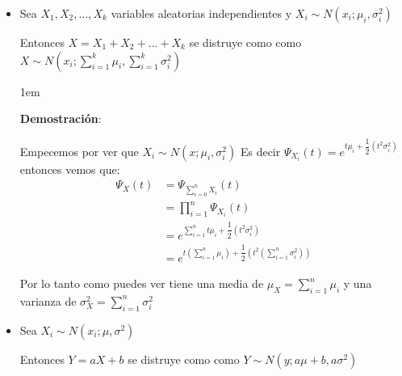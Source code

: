 \documentclass[12pt, fleqn]{report}                             %
\newenvironment{SmallIndentation}[1][0.75em]                    %
        {\begin{adjustwidth}{#1}{}\begin{footnotesize}}             %
        {\end{footnotesize}\end{adjustwidth}}                       %
\theoremstyle{break}                                            %
\newcommand{\Wrap}[1]{\left( #1 \right)}                        %
\begin{document}
                \begin{itemize}

                    \item 
                        Sea $X_1, X_2, \dots, X_k$ variables aleatorias independientes
                        y $X_i \sim N(x_i; \mu_i, \sigma_i^2)$  

                        Entonces $X = X_1 + X_2 + \dots + X_k$ se distruye como
                        como $X \sim N(x_i; \sum_{i=1}^k \mu_i, \sum_{i=1}^k \sigma_i^2)$

                        \begin{SmallIndentation}[1em]
                            \textbf{Demostración}:
                            
                            Empecemos por ver que $X_i \sim N(x; \mu_i, \sigma^2_i)$
                            Es decir $\Psi_{X_i}(t) = e^{t\mu_i + \dfrac{1}{2}(t^2\sigma^2_i)}$
                            entonces vemos que:
                            \begin{align*}
                                \Psi_X(t)
                                    &= \Psi_{\sum_{i=0}^n X_i} (t)                                                          \\
                                    &= \prod_{i=1}^n \Psi_{X_i} (t)                                                         \\
                                    &= e^{\sum_{i=1}^n t\mu_i + \dfrac{1}{2}(t^2\sigma^2_i)}                                \\    
                                    &= e^{t\Wrap{ \sum_{i=1}^n \mu_i} + \dfrac{1}{2}(t^2\Wrap{\sum_{i=1}^n \sigma^2_i})} 
                            \end{align*}

                            Por lo tanto como puedes ver tiene una media de $\mu_X = \sum_{i=1}^n \mu_i$
                            y una varianza de $\sigma^2_X = \sum_{i=1}^n \sigma^2_i$

                        \end{SmallIndentation}
                            


                    \item 
                        Sea $X_i \sim N(x_i; \mu, \sigma^2)$  

                        Entonces $Y = aX + b$ se distruye como
                        como $Y \sim N(y; a\mu + b, a\sigma^2)$


\end{itemize}
\end{document}
